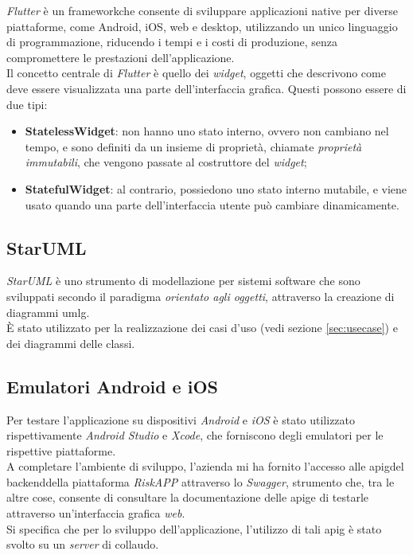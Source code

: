 \emph{Flutter}\cite{site:flutter} è un \gls{framework}\glsoccur che consente di sviluppare applicazioni native per diverse piattaforme, come Android, iOS, web e desktop, utilizzando un unico linguaggio di programmazione, riducendo i tempi e i costi di produzione, senza compromettere le prestazioni dell'applicazione.\\
Il concetto centrale di \emph{Flutter} è quello dei \emph{widget}, oggetti che descrivono come deve essere visualizzata una parte dell'interfaccia grafica. Questi possono essere di due tipi:
\begin{itemize}
    \item \textbf{StatelessWidget}: non hanno uno stato interno, ovvero non cambiano nel tempo, e sono definiti da un insieme di proprietà, chiamate \emph{proprietà immutabili}, che vengono passate al costruttore del \emph{widget};
    \item \textbf{StatefulWidget}: al contrario, possiedono uno stato interno mutabile, e viene usato quando una parte dell'interfaccia utente può cambiare dinamicamente.
\end{itemize}

\subsection*{StarUML}
\label{subsec:staruml}

\emph{StarUML}\cite{site:staruml} è uno strumento di modellazione per sistemi software che sono sviluppati secondo il paradigma \emph{orientato agli oggetti}, attraverso la creazione di diagrammi \gls{umlg}\glsoccur.\\
È stato utilizzato per la realizzazione dei casi d'uso (vedi sezione \ref{sec:usecase}) e dei diagrammi delle classi.\\

\subsection*{Emulatori Android e iOS}
\label{subsec:emulatori}

Per testare l'applicazione su dispositivi \emph{Android} e \emph{iOS} è stato utilizzato rispettivamente \emph{Android Studio}\cite{site:android-studio} e \emph{Xcode}\cite{site:xcode}, che forniscono degli emulatori per le rispettive piattaforme.\\

A completare l'ambiente di sviluppo, l'azienda mi ha fornito l'accesso alle \gls{apig}\glsoccur del \gls{backend}\glsoccur della piattaforma \emph{RiskAPP} attraverso lo \emph{Swagger}\cite{site:swagger}, strumento che, tra le altre cose, consente di consultare la documentazione delle \gls{apig}\glsoccur e di testarle attraverso un'interfaccia grafica \emph{web}.\\
Si specifica che per lo sviluppo dell'applicazione, l'utilizzo di tali \gls{apig} è stato svolto su un \emph{server} di collaudo.